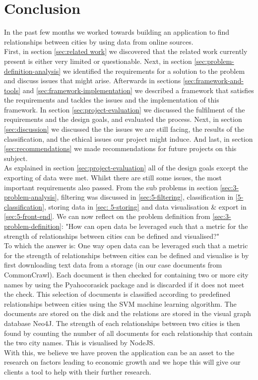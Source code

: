 \chapter{Conclusion}
In the past few months we worked towards building an application to find relationships between cities by using data from online sources.  \\

First, in section \ref{sec:related work} we discovered that the related work currently present is either very limited or questionable. Next, in section \ref{sec:problem-definition-analysis} we identified the requirements for a solution to the problem and discuss issues that might arise. Afterwards in sections \ref{sec:framework-and-tools} and \ref{sec:framework-implementation} we described a framework that satisfies the requirements and tackles the issues and the implementation of this framework. In section \ref{sec:project-evaluation} we discussed the fulfilment of the requirements and the design goals, and evaluated the process. Next, in section \ref{sec:discussion} we discussed the the issues we are still facing, the results of the classification, and the ethical issues our project might induce. And last, in section \ref{sec:recommendations} we made recommendations for future projects on this subject. \\

As explained in section \ref{sec:project-evaluation} all of the design goals except the exporting of data were met. Whilst there are still some issues, the most important requirements also passed. From the sub problems in section \ref{sec:3-problem-analysis}, filtering was discussed in \ref{sec:5-filtering}, classification in \ref{5-classification}, storing data in \ref{sec: 5-storing} and data visualisation \& export in \ref{sec:5-front-end}. We can now reflect on the problem definition from \ref{sec:3-problem-definition}: "How can open data be leveraged such that a metric for the strength of relationships between cities can be defined and visualised?" \\

To which the answer is: One way open data can be leveraged such that a metric for the strength of relationships between cities can be defined and visualise is by first downloading text data from a storage (in our case documents from CommonCrawl). Each document is then checked for containing two or more city names by using the Pyahocorasick package and is discarded if it does not meet the check. This selection of documents is classified according to predefined relationships between cities using the SVM machine learning algorithm. The documents are stored on the disk and the relations are stored in the visual graph database Neo4J. The strength of each relationships between two cities is then found by counting the number of all documents for each relationship that contain the two city names. This is visualised by NodeJS. \\

With this, we believe we have proven the application can be an asset to the research on factors leading to economic growth and we hope this will give our clients a tool to help with their further research. 


